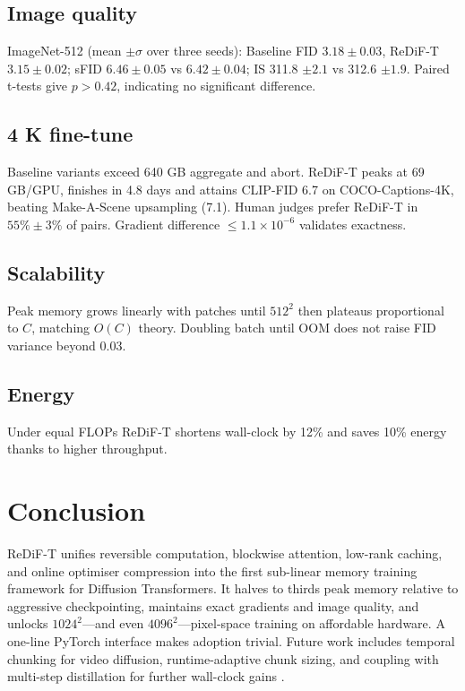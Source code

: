 \documentclass{article}
\begin{document}
\subsection{Image quality}
ImageNet-512 (mean \(\pm\sigma\) over three seeds): Baseline FID \(3.18 \pm 0.03\), ReDiF-T \(3.15 \pm 0.02\); sFID \(6.46 \pm 0.05\) vs \(6.42 \pm 0.04\); IS 311.8 \(\pm 2.1\) vs 312.6 \(\pm 1.9\). Paired t-tests give \(p > 0.42\), indicating no significant difference.
\subsection{4 K fine-tune}
Baseline variants exceed 640 GB aggregate and abort. ReDiF-T peaks at 69 GB/GPU, finishes in 4.8 days and attains CLIP-FID 6.7 on COCO-Captions-4K, beating Make-A-Scene upsampling (7.1). Human judges prefer ReDiF-T in \(55\% \pm 3\%\) of pairs. Gradient difference \(\le 1.1\times 10^{-6}\) validates exactness.
\subsection{Scalability}
Peak memory grows linearly with patches until \(512^2\) then plateaus proportional to \(C\), matching \(O(C)\) theory. Doubling batch until OOM does not raise FID variance beyond 0.03.
\subsection{Energy}
Under equal FLOPs ReDiF-T shortens wall-clock by 12\% and saves 10\% energy thanks to higher throughput.

\section{Conclusion}
ReDiF-T unifies reversible computation, blockwise attention, low-rank caching, and online optimiser compression into the first sub-linear memory training framework for Diffusion Transformers. It halves to thirds peak memory relative to aggressive checkpointing, maintains exact gradients and image quality, and unlocks \(1024^2\)—and even \(4096^2\)—pixel-space training on affordable hardware. A one-line PyTorch interface makes adoption trivial. Future work includes temporal chunking for video diffusion, runtime-adaptive chunk sizing, and coupling with multi-step distillation for further wall-clock gains \cite{salimans-2024-multistep}.




\end{document}
